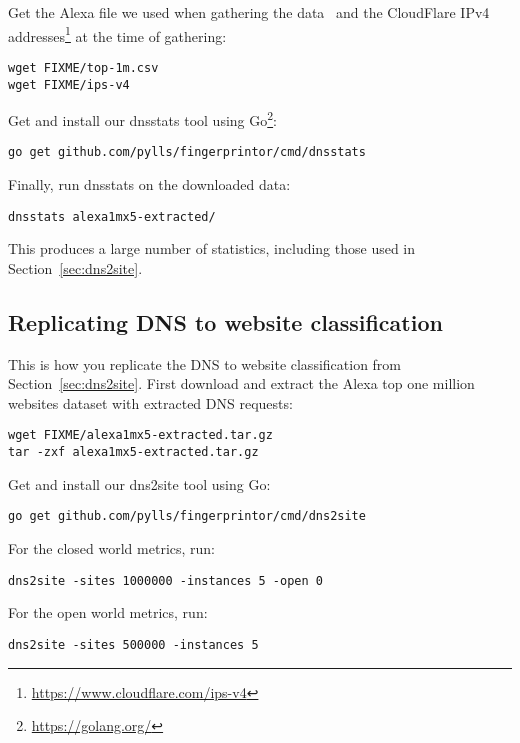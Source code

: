 Get the Alexa file we used when gathering the data~\cite{alexatop1k} and
the CloudFlare IPv4
addresses\footnote{\url{https://www.cloudflare.com/ips-v4}} at the time of
gathering:

\begin{lstlisting}
wget FIXME/top-1m.csv
wget FIXME/ips-v4
\end{lstlisting}

Get and install our dnsstats tool using Go\footnote{\url{https://golang.org/}}:

\begin{lstlisting}
go get github.com/pylls/fingerprintor/cmd/dnsstats
\end{lstlisting}

Finally, run dnsstats on the downloaded data:

\begin{lstlisting}
dnsstats alexa1mx5-extracted/
\end{lstlisting}

This produces a large number of statistics, including those used in
 Section~\ref{sec:dns2site}.

\subsection{Replicating DNS to website classification}
This is how you replicate the DNS to website classification from
Section~\ref{sec:dns2site}.
First download and extract the Alexa top one
million websites dataset with extracted DNS requests:

\begin{lstlisting}
wget FIXME/alexa1mx5-extracted.tar.gz
tar -zxf alexa1mx5-extracted.tar.gz
\end{lstlisting}

Get and install our dns2site tool using Go:

\begin{lstlisting}
go get github.com/pylls/fingerprintor/cmd/dns2site
\end{lstlisting}

For the closed world metrics, run:

\begin{lstlisting}
dns2site -sites 1000000 -instances 5 -open 0
\end{lstlisting}

For the open world metrics, run:

\begin{lstlisting}
dns2site -sites 500000 -instances 5
\end{lstlisting}

